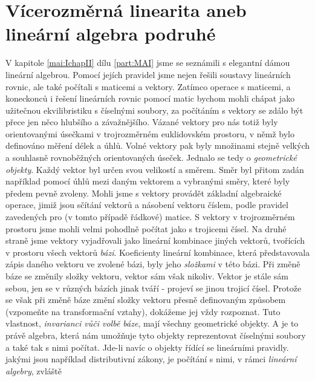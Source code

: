 \chapter{Vícerozměrná linearita aneb lineární algebra podruhé}\label{mai:IIchapI}
\minitoc
  V kapitole \ref{mai:IchapII} dílu \ref{part:MAI} jsme se seznámili s elegantní dámou lineární 
  algebrou. Pomocí jejích pravidel jsme nejen řešili soustavy lineárních rovnic, ale také počítali 
  s maticemi a vektory. Zatímco operace s maticemi, a koneckonců i řešení lineárních rovnic pomocí 
  matic bychom mohli chápat jako užitečnou ekvilibristiku s číselnými soubory, za počítáním s 
  vektory se zdálo být přece jen něco hlubšího a závažnějšího. Vázané vektory pro nás totiž byly 
  orientovanými úsečkami v trojrozměrném euklidovském prostoru, v němž bylo definováno měření délek 
  a úhlů. Volné vektory pak byly množinami stejně velkých a souhlasně rovnoběžných orientovaných 
  úseček. Jednalo se tedy o \emph{geometrické objekty}. Každý vektor byl určen svou velikostí a 
  směrem. Směr byl přitom zadán například pomocí úhlů mezi daným vektorem a vybranými směry, které 
  byly předem pevně zvoleny. Mohli jsme s vektory provádět základní algebraické operace, jimiž jsou 
  sčítání vektorů a násobení vektoru číslem, podle pravidel zavedených pro (v tomto případě 
  řádkové) matice. S vektory v trojrozměrném prostoru jsme mohli velmi pohodlně počítat jako s 
  trojicemi čísel. Na druhé straně jsme vektory vyjadřovali jako lineární kombinace jiných vektorů, 
  tvořících v prostoru všech vektorů \emph{bázi}. Koeficienty lineární kombinace, která 
  představovala zápis daného vektoru ve zvolené bázi, byly jeho \emph{složkami} v této bázi. Při 
  změně báze se změnily složky vektoru, vektor sám však nikoliv. Vektor je stále sám sebou, jen se 
  v různých bázích jinak tváří - projeví se jinou trojicí čísel. Protože se však při změně báze 
  změní složky vektoru přesně definovaným způsobem (vzpomeňte na transformační vztahy), dokážeme 
  jej vždy rozpoznat. Tuto vlastnost, \emph{invarianci vůči volbě báze}, mají všechny geometrické 
  objekty. A je to právě algebra, která nám umožňuje tyto objekty reprezentovat číselnými soubory a 
  také tak s nimi počítat. Jde-li navíc o objekty řídící se lineárními pravidly. jakými jsou 
  například distributivní zákony, je počítání s nimi, v rámci \emph{lineární algebry}, zvláště 
